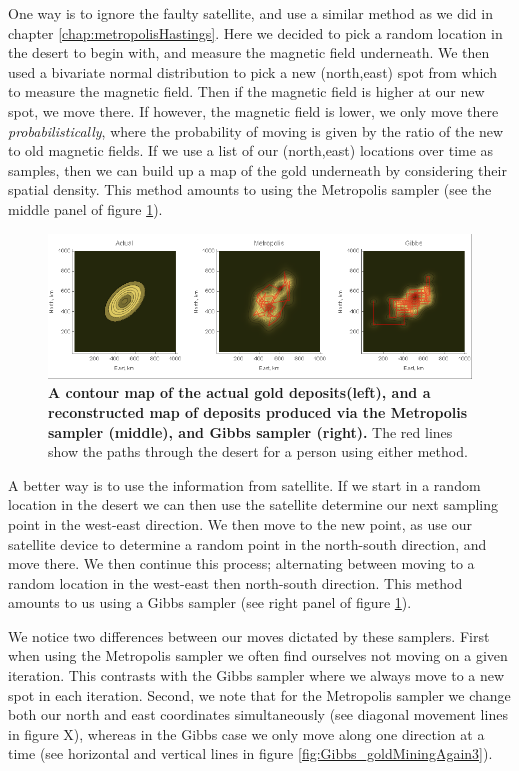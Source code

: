 \documentclass[11pt,fullpage]{book}
\begin{document}
One way is to ignore the faulty satellite, and use a similar method as we did in chapter \ref{chap:metropolisHastings}. Here we decided to pick a random location in the desert to begin with, and measure the magnetic field underneath. We then used a bivariate normal distribution to pick a new (north,east) spot from which to measure the magnetic field. Then if the magnetic field is higher at our new spot, we move there. If however, the magnetic field is lower, we only move there \textit{probabilistically}, where the probability of moving is given by the ratio of the new to old magnetic fields. If we use a list of our (north,east) locations over time as samples, then we can build up a map of the gold underneath by considering their spatial density. This method amounts to using the Metropolis sampler (see the middle panel of figure \ref{fig:Gibbs_goldMiningAgain2}).

\begin{figure}
\centerline{\includegraphics[width=1\textwidth]{Gibbs_goldMiningAgain2.png}}
\caption{\textbf{A contour map of the actual gold deposits(left), and a reconstructed map of deposits produced via the Metropolis sampler (middle), and Gibbs sampler (right).} The red lines show the paths through the desert for a person using either method.}\label{fig:Gibbs_goldMiningAgain2}
\end{figure}

A better way is to use the information from satellite. If we start in a random location in the desert we can then use the satellite determine our next sampling point in the west-east direction. We then move to the new point, as use our satellite device to determine a random point in the north-south direction, and move there. We then continue this process; alternating between moving to a random location in the west-east then north-south direction. This method amounts to us using a Gibbs sampler (see right panel of figure \ref{fig:Gibbs_goldMiningAgain2}).

We notice two differences between our moves dictated by these samplers. First when using the Metropolis sampler we often find ourselves not moving on a given iteration. This contrasts with the Gibbs sampler where we always move to a new spot in each iteration. Second, we note that for the Metropolis sampler we change both our north and east coordinates simultaneously (see diagonal movement lines in figure X), whereas in the Gibbs case we only move along one direction at a time (see horizontal and vertical lines in figure \ref{fig:Gibbs_goldMiningAgain3}).
\end{document}
